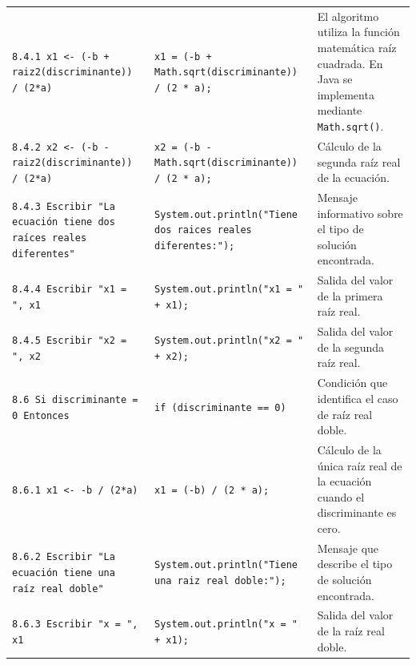 \documentclass[12pt,twoside]{book}
\begin{document}
\begin{landscape}
\begin{longtable}{p{6cm} p{6cm} p{7.5cm}}
							
							\texttt{8.4.1 x1 <- (-b + raiz2(discriminante)) / (2*a)}
							&
							\texttt{x1 = (-b + Math.sqrt(discriminante)) / (2 * a);}
							&
							El algoritmo utiliza la función matemática raíz cuadrada. En Java se implementa mediante \texttt{Math.sqrt()}. \\
							
							
							\texttt{8.4.2 x2 <- (-b - raiz2(discriminante)) / (2*a)}
							&
							\texttt{x2 = (-b - Math.sqrt(discriminante)) / (2 * a);}
							&
							Cálculo de la segunda raíz real de la ecuación. \\
							
							
							\texttt{8.4.3 Escribir "La ecuación tiene dos raíces reales diferentes"}
							&
							\texttt{System.out.println("Tiene dos raices reales diferentes:");}
							&
							Mensaje informativo sobre el tipo de solución encontrada. \\
							
							
							\texttt{8.4.4 Escribir "x1 = ", x1}
							&
							\texttt{System.out.println("x1 = " + x1);}
							&
							Salida del valor de la primera raíz real. \\
							
							
							\texttt{8.4.5 Escribir "x2 = ", x2}
							&
							\texttt{System.out.println("x2 = " + x2);}
							&
							Salida del valor de la segunda raíz real. \\
							
							
							\texttt{8.6 Si discriminante = 0 Entonces}
							&
							\texttt{if (discriminante == 0)}
							&
							Condición que identifica el caso de raíz real doble. \\
							
							
							\texttt{8.6.1 x1 <- -b / (2*a)}
							&
							\texttt{x1 = (-b) / (2 * a);}
							&
							Cálculo de la única raíz real de la ecuación cuando el discriminante es cero. \\
							
							
							\texttt{8.6.2 Escribir "La ecuación tiene una raíz real doble"}
							&
							\texttt{System.out.println("Tiene una raiz real doble:");}
							&
							Mensaje que describe el tipo de solución encontrada. \\
							
							
							\texttt{8.6.3 Escribir "x = ", x1}
							&
							\texttt{System.out.println("x = " + x1);}
							&
							Salida del valor de la raíz real doble. \\
							

\end{longtable}
\end{landscape}
\end{document}
